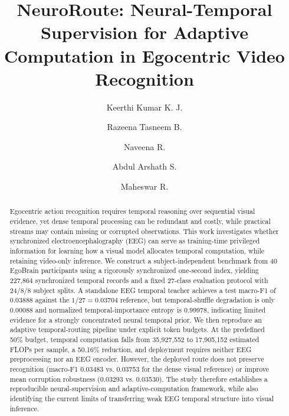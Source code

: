 \documentclass[runningheads]{llncs}
\begin{document}
\title{NeuroRoute: Neural-Temporal Supervision for Adaptive Computation in Egocentric Video Recognition}


\author{
Keerthi Kumar K. J.\and
Razeena Tasneem B.\and
Naveena R.\and
Abdul Arshath S.\and
Maheswar R.}



\maketitle

\begin{abstract}
Egocentric action recognition requires temporal reasoning over sequential visual evidence, yet dense temporal processing can be redundant and costly, while practical streams may contain missing or corrupted observations. This work investigates whether synchronized electroencephalography (EEG) can serve as training-time privileged information for learning how a visual model allocates temporal computation, while retaining video-only inference. We construct a subject-independent benchmark from 40 EgoBrain participants using a rigorously synchronized one-second index, yielding 227,864 synchronized temporal records and a fixed 27-class evaluation protocol with 24/8/8 subject splits. A standalone EEG temporal teacher achieves a test macro-F1 of 0.03888 against the $1/27=0.03704$ reference, but temporal-shuffle degradation is only 0.00088 and normalized temporal-importance entropy is 0.99978, indicating limited evidence for a strongly concentrated neural temporal prior. We then reproduce an adaptive temporal-routing pipeline under explicit token budgets. At the predefined 50\% budget, temporal computation falls from 35,927,552 to 17,905,152 estimated FLOPs per sample, a 50.16\% reduction, and deployment requires neither EEG preprocessing nor an EEG encoder. However, the deployed route does not preserve recognition (macro-F1 0.03483 vs. 0.03753 for the dense visual reference) or improve mean corruption robustness (0.03293 vs. 0.03530). The study therefore establishes a reproducible neural-supervision and adaptive-computation framework, while also identifying the current limits of transferring weak EEG temporal structure into visual inference.

\end{abstract}
\end{document}
